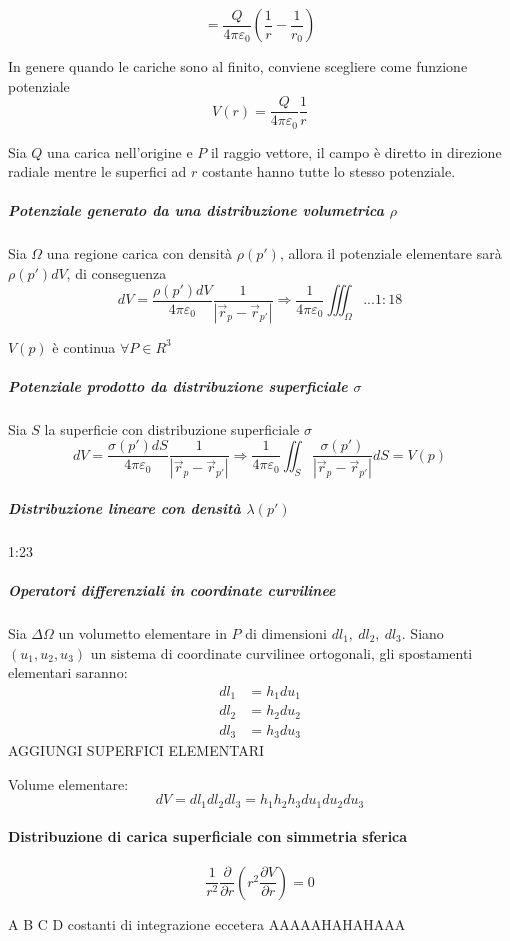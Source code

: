 $$
 = \frac{Q}{4\pi\varepsilon_0}\left(\frac{1}{r} - \frac{1}{r_0}\right)
$$


In genere quando le cariche sono al finito, conviene scegliere come funzione potenziale
$$
V(r) = \frac{Q}{4 \pi \varepsilon_0}\frac{1}{r}
$$

Sia $Q$ una carica nell'origine e $P$ il raggio vettore, il campo è diretto in direzione radiale
mentre le superfici ad $r$ costante hanno tutte lo stesso potenziale.

\subparagraph{Potenziale generato da una distribuzione volumetrica $\rho$}
Sia $\Omega$ una regione carica con densità $\rho(p')$, allora il potenziale elementare sarà
$\rho(p')dV$, di conseguenza
$$
dV = \frac{\rho(p')dV}{4\pi\varepsilon_0}\frac{1}{|\vec{r}_p - \vec{r}_{p'}|} \Rightarrow
\frac{1}{4\pi\varepsilon_0} \iiint_\Omega ... 1:18
$$

$V(p)$ è continua $\forall P \in R^3$

\subparagraph{Potenziale prodotto da distribuzione superficiale $\sigma$}
Sia $S$ la superficie con distribuzione superficiale $\sigma$
$$
dV = \frac{\sigma(p')dS}{4\pi\varepsilon_0} \frac{1}{|\vec{r}_p - \vec{r}_{p'}|} \Rightarrow
\frac{1}{4\pi\varepsilon_0} \iint_S \frac{\sigma(p')}{|\vec{r}_p - \vec{r}_{p'}|} dS = V(p)
$$

\subparagraph{Distribuzione lineare con densità $\lambda(p')$}
1:23

\subparagraph{Operatori differenziali in coordinate curvilinee}
Sia $\Delta\Omega$ un volumetto elementare in $P$ di dimensioni $dl_1,\ dl_2,\ dl_3$.
Siano $(u_1,u_2,u_3)$ un sistema di coordinate curvilinee ortogonali, gli spostamenti elementari
saranno:
\begin{align*}
dl_1 &= h_1du_1\\
dl_2 &= h_2du_2\\
dl_3 &= h_3du_3
\end{align*}
AGGIUNGI SUPERFICI ELEMENTARI

Volume elementare:
$$
dV = dl_1dl_2dl_3 = h_1h_2h_3du_1du_2du_3
$$






\paragraph{Distribuzione di carica superficiale con simmetria sferica}
$$
\frac{1}{r^2}\frac{\partial}{\partial r} \left(r^2 \frac{\partial V}{\partial r}\right) = 0
$$

A B C D costanti di integrazione eccetera AAAAAHAHAHAAA

